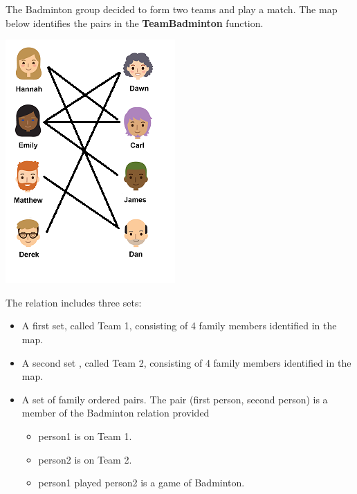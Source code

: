 \documentclass{ximera}
\begin{document}
\begin{definition}
The Badminton group decided to form two teams and play a match. The map below identifies the pairs in the \textbf{TeamBadminton} function.
  
  

    \includegraphics[width=245px,height=352px]{pics/badminton.png}

  
 

  The  relation includes three sets:
    \begin{itemize}
    \item A first set, called Team 1, consisting of 4 family members identified in the map.
    \item A second set , called Team 2, consisting of 4 family members identified in the map.
    \item A set of family ordered pairs. The pair (first person, second person) is a member of the Badminton relation  provided
            \begin{itemize}
            \item person1 is on Team 1.
            \item person2 is on Team 2.
            \item person1 played person2 is a game of Badminton.
            \end{itemize}

    \end{itemize}

  
\end{definition}
\end{document}
